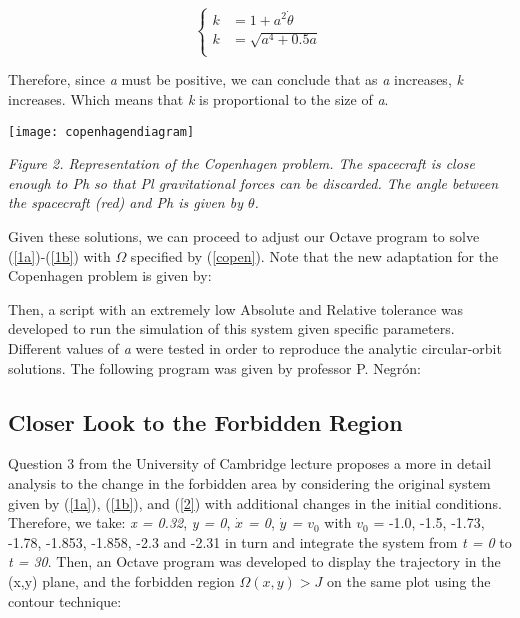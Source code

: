 \documentclass{article}
\begin{document}
\begin{equation}\label{copen10}
\begin{cases}
k & = 1 + a^2\dot{\theta} \\
k & = \sqrt {a^4 + 0.5a }\\
\end{cases}
\end{equation}

Therefore, since \textit{a} must be positive, we can conclude that as \textit{a} increases, \textit{k} increases. Which means that \textit{k} is proportional to the size of \textit{a}.

\begin{center}
  \texttt{[image: copenhagendiagram]}
\end{center}

\begin{center}
   \textit{Figure 2. Representation of the Copenhagen problem. The spacecraft is close enough to \textit{Ph} so that \textit{Pl} gravitational forces can be discarded. The angle between the spacecraft (red) and \textit{Ph} is given by $\theta$.}
\end{center}

Given these solutions, we can proceed to adjust our Octave program to solve (\ref{1a})-(\ref{1b}) with $\Omega$ specified by (\ref{copen}). Note that the new adaptation for the Copenhagen problem is given by:



Then, a script with an extremely low Absolute and Relative tolerance was developed to run the simulation of this system given specific parameters. Different values of \textit{a} were tested in order to reproduce the analytic circular-orbit solutions. The following program was given by professor P. Negr\'{o}n:



\subsection{Closer Look to the Forbidden Region}

Question 3 from the University of Cambridge lecture proposes a more in detail analysis to the change in the forbidden area by considering the original system given by (\ref{1a}), (\ref{1b}), and (\ref{2}) with additional changes in the initial conditions. Therefore, we take: \textit{x = 0.32}, \textit{y = 0}, \textit{$\dot{x}$ = 0}, \textit{$\dot{y}$ = $v_0$} with \textit{$v_0$} = -1.0, -1.5, -1.73, -1.78, -1.853, -1.858, -2.3 and -2.31 in turn and integrate the system from \textit{t = 0} to \textit{t = 30}. Then, an Octave program was developed to display the trajectory in the (x,y) plane, and the forbidden region $\Omega(x,y) > J$ on the same plot using the contour technique:
\end{document}
